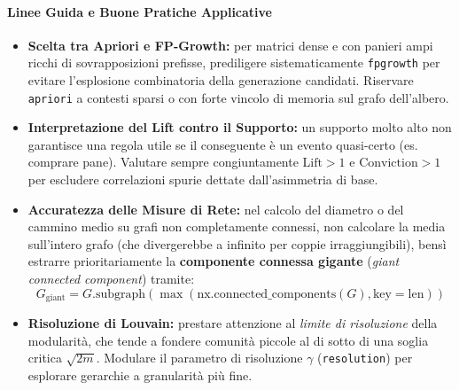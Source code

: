 \paragraph{Linee Guida e Buone Pratiche Applicative}
\begin{itemize}
    \item \textbf{Scelta tra Apriori e FP-Growth:} per matrici dense e con panieri ampi ricchi di sovrapposizioni prefisse, prediligere sistematicamente \texttt{fpgrowth} per evitare l'esplosione combinatoria della generazione candidati. Riservare \texttt{apriori} a contesti sparsi o con forte vincolo di memoria sul grafo dell'albero.
    \item \textbf{Interpretazione del Lift contro il Supporto:} un supporto molto alto non garantisce una regola utile se il conseguente è un evento quasi-certo (es. comprare pane). Valutare sempre congiuntamente $\text{Lift} > 1$ e $\text{Conviction} > 1$ per escludere correlazioni spurie dettate dall'asimmetria di base.
    \item \textbf{Accuratezza delle Misure di Rete:} nel calcolo del diametro o del cammino medio su grafi non completamente connessi, non calcolare la media sull'intero grafo (che divergerebbe a infinito per coppie irraggiungibili), bensì estrarre prioritariamente la \textbf{componente connessa gigante} (\textit{giant connected component}) tramite:
    \begin{equation*}
        G_{\text{giant}} = G.\text{subgraph}(\max(\text{nx.connected\_components}(G), \text{key}=\text{len}))
    \end{equation*}
    \item \textbf{Risoluzione di Louvain:} prestare attenzione al \textit{limite di risoluzione} della modularità, che tende a fondere comunità piccole al di sotto di una soglia critica $\sqrt{2m}$. Modulare il parametro di risoluzione $\gamma$ (\texttt{resolution}) per esplorare gerarchie a granularità più fine.
\end{itemize}
